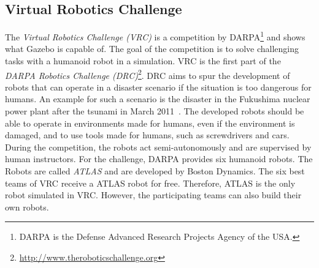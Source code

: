 \subsection{Virtual Robotics Challenge}
The \textit{Virtual Robotics Challenge (VRC)} is a competition by DARPA\footnote{DARPA is the Defense Advanced Research Projects Agency of the USA.} and shows what Gazebo is capable of. The goal of the competition is to solve challenging tasks with a humanoid robot in a simulation. VRC is the first part of the \textit{DARPA Robotics Challenge (DRC)}\footnote{\url{http://www.theroboticschallenge.org}}. DRC aims to spur the development of robots that can operate in a disaster scenario if the situation is too dangerous for humans. An example for such a scenario is the disaster in the Fukushima nuclear power plant after the tsunami in March 2011~\cite{fukushima}. The developed robots should be able to operate in environments made for humans, even if the environment is damaged, and to use tools made for humans, such as screwdrivers and cars. During the competition, the robots act semi-autonomously and are supervised by human instructors. For the challenge, DARPA provides six humanoid robots. The Robots are called \textit{ATLAS} and are developed by Boston Dynamics. The six best teams of VRC receive a ATLAS robot for free. Therefore, ATLAS is the only robot simulated in VRC. However, the participating teams can also build their own robots.

